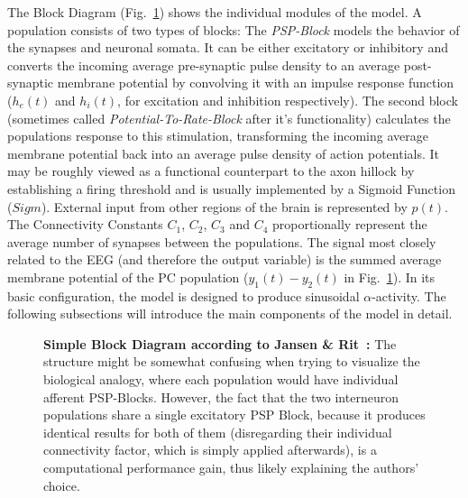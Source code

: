 The Block Diagram (Fig.~\ref{fig:Jansen Rit Simple}) shows the individual modules of the model.
A population consists of two types of blocks:
The \textit{PSP-Block} models the behavior of the synapses and neuronal somata.
It can be either excitatory or inhibitory and converts the incoming average pre-synaptic pulse density to
an average post-synaptic membrane potential by convolving it  with an
impulse response function ($h_e(t)$ and $h_i(t)$, for excitation and inhibition respectively).
The second block (sometimes called \textit{Potential-To-Rate-Block} after it's functionality)
calculates the populations response to this stimulation, transforming the incoming
average membrane potential back into an average pulse density of action potentials.
It may be roughly viewed as a functional counterpart to the axon hillock by establishing a firing threshold
and is usually implemented by a Sigmoid Function ($Sigm$).
External input from other regions of the brain is represented by $p(t)$.
The Connectivity Constants $C_1$, $C_2$, $C_3$ and $C_4$ proportionally represent the
average number of synapses between the populations.
The signal most closely related to the EEG (and therefore the output variable)
is the summed average membrane potential of the PC population ($y_1(t)-y_2(t)$ in Fig.~\ref{fig:Jansen Rit Simple}).
In its basic configuration, the model is designed to produce sinusoidal $\alpha$-activity.
The following subsections will introduce the main components of the model in detail.

\begin{figure}[H]
    \centering
    
    \caption{\textbf{Simple Block Diagram according to Jansen \& Rit~\cite{jansen_electroencephalogram_1995}:}
    The structure might be somewhat confusing when trying to visualize the biological analogy,
        where each population would have individual afferent PSP-Blocks.
        However, the fact that the two interneuron populations share a single excitatory PSP Block,
        because it produces identical results for both of them (disregarding their individual connectivity factor,
        which is simply applied afterwards), is a computational performance gain,
        thus likely explaining the authors' choice.}
    \label{fig:Jansen Rit Simple}
\end{figure}

